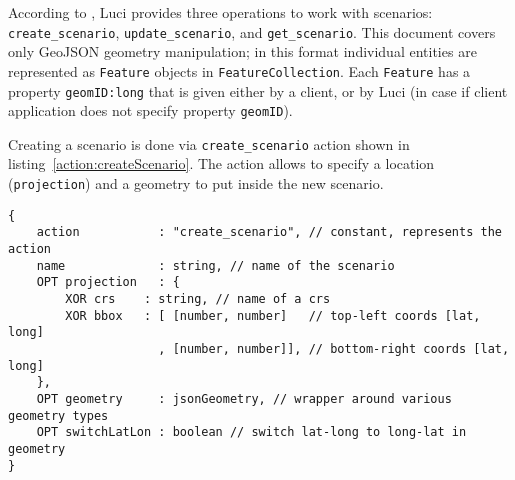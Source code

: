 
According to ,
\ac{Luci} provides three operations to work with scenarios:
\texttt{create\_scenario}, \texttt{update\_scenario}, and \texttt{get\_scenario}.
This document covers only GeoJSON geometry manipulation;
in this format individual entities are represented as \texttt{Feature} objects in \texttt{FeatureCollection}.
Each \texttt{Feature} has a property \texttt{geomID:\color{blue}long} that is given either by a client, or by \ac{Luci} (in case if client application does not specify property \texttt{geomID}).


Creating a scenario is done
via \texttt{create\_scenario} action shown in listing~\ref{action:createScenario}.
The action allows to specify a location (\texttt{projection}) and a geometry to put inside the new scenario.
\begin{lstlisting}[caption={JSON action structure for creating a scenario in \ac{Luci}}, label={action:createScenario}]
{
	action           : "create_scenario", // constant, represents the action
	name             : string, // name of the scenario
	OPT projection   : {
		XOR crs    : string, // name of a crs
		XOR bbox   : [ [number, number]   // top-left coords [lat, long]
		             , [number, number]], // bottom-right coords [lat, long]
	},
	OPT geometry     : jsonGeometry, // wrapper around various geometry types
	OPT switchLatLon : boolean // switch lat-long to long-lat in geometry
}
\end{lstlisting}


